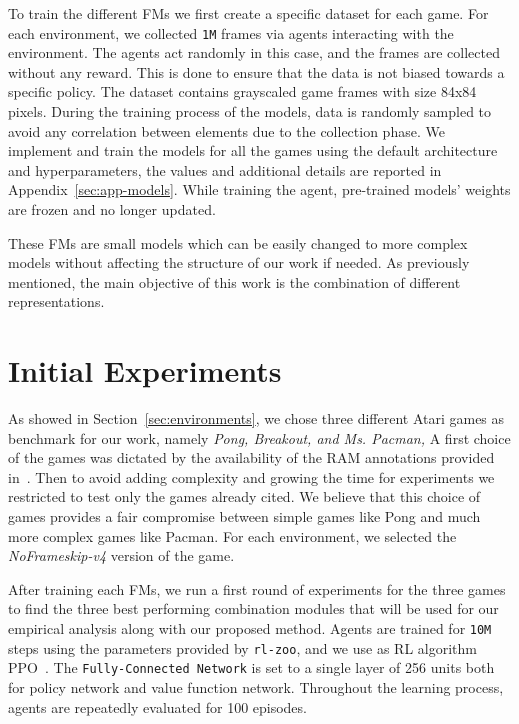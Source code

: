 To train the different FMs we first create a specific dataset for each game.
For each environment, we collected \texttt{1M} frames via agents interacting with the environment.
The agents act randomly in this case, and the frames are collected without any reward.
This is done to ensure that the data is not biased towards a specific policy.
The dataset contains grayscaled game frames with size 84x84 pixels.
During the training process of the models, data is randomly sampled to avoid any correlation between elements due to the collection phase.
We implement and train the models for all the games using the default architecture and hyperparameters, the values and additional details are reported in Appendix~\ref{sec:app-models}.
While training the agent, pre-trained models' weights are frozen and no longer updated.

These FMs are small models which can be easily changed to more complex models without affecting the structure of our work if needed.
As previously mentioned, the main objective of this work is the combination of different representations.


\section{Initial Experiments}\label{sec:init_exp}
As showed in Section~\ref{sec:environments}, we chose three different Atari games as benchmark for our work, namely \textit{Pong, Breakout, and Ms. Pacman,}
A first choice of the games was dictated by the availability of the RAM annotations provided in~\cite{anand2019unsupervised}.
Then to avoid adding complexity and growing the time for experiments we restricted to test only the games already cited.
We believe that this choice of games provides a fair compromise between simple games like Pong and much more complex games like Pacman.
For each environment, we selected the \textit{NoFrameskip-v4} version of the game.


After training each FMs, we run a first round of experiments for the three games to find the three best performing combination modules that will be used for our empirical analysis along with our proposed method.
Agents are trained for \texttt{10M} steps using the parameters provided by \texttt{rl-zoo}, and we use as RL algorithm PPO~\citep{schulman2017proximal}.
The \texttt{Fully-Connected Network} is set to a single layer of 256 units both for policy network and value function network.
Throughout the learning process, agents are repeatedly evaluated for 100 episodes.


